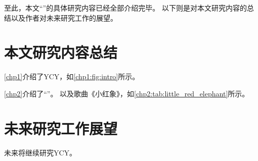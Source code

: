 \ifx\mainpage\undefined
\def\chpConcl{chpConcl}

\else
\glsresetall
\fi

\begin{conclusion} 
至此，本文``\maintitle''的具体研究内容已经全部介绍完毕。
以下则是对本文研究内容的总结以及作者对未来研究工作的展望。

\section*{本文研究内容总结}
%

\cref{chp1}介绍了\gls{YCY}，如\cref{chp1:fig:intro}所示。

\cref{chp2}介绍了``\chptitleTwo''。
以及歌曲《小红象》，如\cref{chp2:tab:little_red_elephant}所示。

\section*{未来研究工作展望}

未来将继续研究\gls{YCY}。

\end{conclusion}

\ifx\mainpage\undefined

\fi